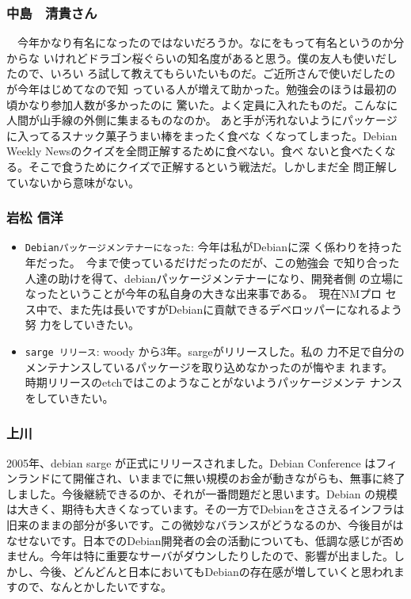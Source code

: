 \documentclass[mingoth,a4paper]{jsarticle}
\begin{document}
\subsubsection{中島　清貴さん}

　今年かなり有名になったのではないだろうか。なにをもって有名というのか分からな
いけれどドラゴン桜ぐらいの知名度があると思う。僕の友人も使いだしたので、いろい
ろ試して教えてもらいたいものだ。ご近所さんで使いだしたのが今年はじめてなので知
っている人が増えて助かった。勉強会のほうは最初の頃かなり参加人数が多かったのに
驚いた。よく定員に入れたものだ。こんなに人間が山手線の外側に集まるものなのか。
あと手が汚れないようにパッケージに入ってるスナック菓子うまい棒をまったく食べな
くなってしまった。Debian Weekly Newsのクイズを全問正解するために食べない。食べ
ないと食べたくなる。そこで食うためにクイズで正解するという戦法だ。しかしまだ全
問正解していないから意味がない。

\subsubsection{岩松 信洋}

\begin{itemize}
 \item \texttt{Debianパッケージメンテナーになった}: 今年は私がDebianに深
く係わりを持った年だった。　今まで使っているだけだったのだが、この勉強会
で知り合った人達の助けを得て、debianパッケージメンテナーになり、開発者側
の立場になったということが今年の私自身の大きな出来事である。　現在NMプロ
セス中で、また先は長いですがDebianに貢献できるデベロッパーになれるよう努
力をしていきたい。
  
 \item \texttt{sarge リリース}: woody から3年。sargeがリリースした。私の
力不足で自分のメンテナンスしているパッケージを取り込めなかったのが悔やま
れます。　時期リリースのetchではこのようなことがないようパッケージメンテ
ナンスをしていきたい。
\end{itemize}

\subsubsection{上川}

2005年、debian sarge が正式にリリースされました。Debian Conference はフィ
ンランドにて開催され、いままでに無い規模のお金が動きながらも、無事に終了
しました。今後継続できるのか、それが一番問題だと思います。Debian の規模
は大きく、期待も大きくなっています。その一方でDebianをささえるインフラは
旧来のままの部分が多いです。この微妙なバランスがどうなるのか、今後目がは
なせないです。日本でのDebian開発者の会の活動についても、低調な感じが否め
ません。今年は特に重要なサーバがダウンしたりしたので、影響が出ました。し
かし、今後、どんどんと日本においてもDebianの存在感が増していくと思われま
すので、なんとかしたいですな。
\end{document}
